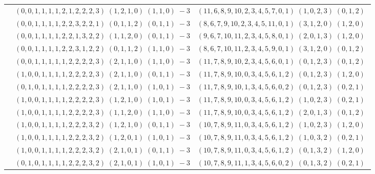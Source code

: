 \documentclass[11pt]{article}
\begin{document}
\begin{longtable}[l]{|c|c|c|}
 \cline{2-3} 
 & $(0 ,0 ,1 ,1 ,1 ,1 ,2 ,1 ,2 ,2 ,2 ,3) \;(1 ,2 ,1 ,0) \;(1 ,1 ,0) \;-3$ & $(11 ,6 ,8 ,9 ,10 ,2 ,3 ,4 ,5 ,7 ,0 ,1) \;(1 ,0 ,2 ,3) \;(0 ,1 ,2) \;$\\ 
 \cline{2-3} 
 & $(0 ,0 ,1 ,1 ,1 ,1 ,2 ,2 ,3 ,2 ,2 ,1) \;(0 ,1 ,1 ,2) \;(0 ,1 ,1) \;-3$ & $(8 ,6 ,7 ,9 ,10 ,2 ,3 ,4 ,5 ,11 ,0 ,1) \;(3 ,1 ,2 ,0) \;(1 ,2 ,0) \;$\\ 
 \cline{2-3} 
 & $(0 ,0 ,1 ,1 ,1 ,1 ,2 ,2 ,1 ,3 ,2 ,2) \;(1 ,1 ,2 ,0) \;(0 ,1 ,1) \;-3$ & $(9 ,6 ,7 ,10 ,11 ,2 ,3 ,4 ,5 ,8 ,0 ,1) \;(2 ,0 ,1 ,3) \;(1 ,2 ,0) \;$\\ 
 \cline{2-3} 
 & $(0 ,0 ,1 ,1 ,1 ,1 ,2 ,2 ,3 ,1 ,2 ,2) \;(0 ,1 ,1 ,2) \;(1 ,1 ,0) \;-3$ & $(8 ,6 ,7 ,10 ,11 ,2 ,3 ,4 ,5 ,9 ,0 ,1) \;(3 ,1 ,2 ,0) \;(0 ,1 ,2) \;$\\ 
 \cline{2-3} 
 & $(0 ,0 ,1 ,1 ,1 ,1 ,1 ,2 ,2 ,2 ,2 ,3) \;(2 ,1 ,1 ,0) \;(1 ,1 ,0) \;-3$ & $(11 ,7 ,8 ,9 ,10 ,2 ,3 ,4 ,5 ,6 ,0 ,1) \;(0 ,1 ,2 ,3) \;(0 ,1 ,2) \;$\\ 
 \cline{2-3} 
 & $(1 ,0 ,0 ,1 ,1 ,1 ,1 ,2 ,2 ,2 ,2 ,3) \;(2 ,1 ,1 ,0) \;(0 ,1 ,1) \;-3$ & $(11 ,7 ,8 ,9 ,10 ,0 ,3 ,4 ,5 ,6 ,1 ,2) \;(0 ,1 ,2 ,3) \;(1 ,2 ,0) \;$\\ 
 \cline{2-3} 
 & $(0 ,1 ,0 ,1 ,1 ,1 ,1 ,2 ,2 ,2 ,2 ,3) \;(2 ,1 ,1 ,0) \;(1 ,0 ,1) \;-3$ & $(11 ,7 ,8 ,9 ,10 ,1 ,3 ,4 ,5 ,6 ,0 ,2) \;(0 ,1 ,2 ,3) \;(0 ,2 ,1) \;$\\ 
 \cline{2-3} 
 & $(1 ,0 ,0 ,1 ,1 ,1 ,1 ,2 ,2 ,2 ,2 ,3) \;(1 ,2 ,1 ,0) \;(1 ,0 ,1) \;-3$ & $(11 ,7 ,8 ,9 ,10 ,0 ,3 ,4 ,5 ,6 ,1 ,2) \;(1 ,0 ,2 ,3) \;(0 ,2 ,1) \;$\\ 
 \cline{2-3} 
 & $(1 ,0 ,0 ,1 ,1 ,1 ,1 ,2 ,2 ,2 ,2 ,3) \;(1 ,1 ,2 ,0) \;(1 ,1 ,0) \;-3$ & $(11 ,7 ,8 ,9 ,10 ,0 ,3 ,4 ,5 ,6 ,1 ,2) \;(2 ,0 ,1 ,3) \;(0 ,1 ,2) \;$\\ 
 \cline{2-3} 
 & $(1 ,0 ,0 ,1 ,1 ,1 ,1 ,2 ,2 ,2 ,3 ,2) \;(1 ,2 ,1 ,0) \;(0 ,1 ,1) \;-3$ & $(10 ,7 ,8 ,9 ,11 ,0 ,3 ,4 ,5 ,6 ,1 ,2) \;(1 ,0 ,2 ,3) \;(1 ,2 ,0) \;$\\ 
 \cline{2-3} 
 & $(1 ,0 ,0 ,1 ,1 ,1 ,1 ,2 ,2 ,2 ,3 ,2) \;(1 ,2 ,0 ,1) \;(1 ,0 ,1) \;-3$ & $(10 ,7 ,8 ,9 ,11 ,0 ,3 ,4 ,5 ,6 ,1 ,2) \;(1 ,0 ,3 ,2) \;(0 ,2 ,1) \;$\\ 
 \cline{2-3} 
 & $(1 ,0 ,0 ,1 ,1 ,1 ,1 ,2 ,2 ,2 ,3 ,2) \;(2 ,1 ,0 ,1) \;(0 ,1 ,1) \;-3$ & $(10 ,7 ,8 ,9 ,11 ,0 ,3 ,4 ,5 ,6 ,1 ,2) \;(0 ,1 ,3 ,2) \;(1 ,2 ,0) \;$\\ 
 \cline{2-3} 
 & $(0 ,1 ,0 ,1 ,1 ,1 ,1 ,2 ,2 ,2 ,3 ,2) \;(2 ,1 ,0 ,1) \;(1 ,0 ,1) \;-3$ & $(10 ,7 ,8 ,9 ,11 ,1 ,3 ,4 ,5 ,6 ,0 ,2) \;(0 ,1 ,3 ,2) \;(0 ,2 ,1) \;$\\ 

\end{longtable}
\end{document}
